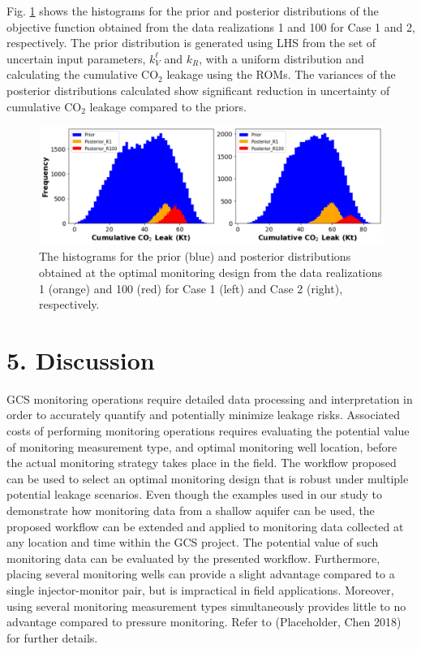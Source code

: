 \documentclass[10pt, twoside]{article}
\begin{document}
Fig. \ref{ur_dist} shows the histograms for the prior and posterior distributions of the objective function obtained from the data realizations 1 and 100 for Case 1 and 2, respectively. The prior distribution is generated using LHS from the set of uncertain input parameters, $k_V^\ell$ and $k_R$, with a uniform distribution and calculating the cumulative CO$_2$ leakage using the ROMs. The variances of the posterior distributions calculated show significant reduction in uncertainty of cumulative CO$_2$ leakage compared to the priors.

\begin{figure} [H]
\centering
\includegraphics[width=14 cm]{Figure 12.png}
\caption{The histograms for the prior (blue) and posterior distributions obtained at the optimal monitoring design from the data realizations 1 (orange) and 100 (red) for Case 1 (left) and Case 2 (right), respectively.}
\label{ur_dist}
\end{figure}

\section*{\textbf{5. Discussion}}
GCS monitoring operations require detailed data processing and interpretation in order to accurately quantify and potentially minimize leakage risks. Associated costs of performing monitoring operations requires evaluating the potential value of monitoring measurement type, and optimal monitoring well location, before the actual monitoring strategy takes place in the field. The workflow proposed can be used to select an optimal monitoring design that is robust under multiple potential leakage scenarios. Even though the examples used in our study to demonstrate how monitoring data from a shallow aquifer can be used, the proposed workflow can be extended and applied to monitoring data collected at any location and time within the GCS project. The potential value of such monitoring data can be evaluated by the presented workflow. Furthermore, placing several monitoring wells can provide a slight advantage compared to a single injector-monitor pair, but is impractical in field applications. Moreover, using several monitoring measurement types simultaneously provides little to no advantage compared to pressure monitoring. Refer to (Placeholder, Chen 2018) for further details.
\end{document}

